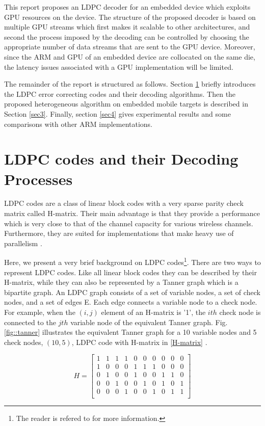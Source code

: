 \documentclass{article}
\begin{document}
This report proposes an LDPC decoder for an embedded device which exploits GPU resources on the device. The structure of the proposed decoder is based on multiple GPU streams which first makes it scalable to other architectures, and second the process imposed by the decoding can be controlled by choosing the appropriate number of data streams that are sent to the GPU device. Moreover, since the ARM and GPU of an embedded device are collocated on the same die, the latency issues associated with a GPU implementation will be limited.

The remainder of the report is structured as follows. Section \ref{sec2} briefly introduces the LDPC error correcting codes and their decoding algorithms. Then the proposed heterogeneous algorithm on embedded mobile targets is described in Section \ref{sec3}. Finally, section \ref{sec4} gives experimental results and some comparisons with other ARM implementations.

\section{LDPC codes and their Decoding Processes}\label{sec2}

LDPC codes are a class of linear block codes with a very sparse parity check matrix called H-matrix. Their main advantage is that they provide a performance which is very close to that of the channel capacity for various wireless channels. Furthermore, they are suited for implementations that make heavy use of parallelism \cite{art_castello}.

Here, we present a very brief background on LDPC codes\footnote{The reader is refered to \cite{art_castello} for more information.}. There are two ways to represent LDPC codes. Like all linear block codes they can be described by their H-matrix, while they can also be represented by a Tanner graph which is a bipartite graph. An LDPC graph consists of a set of variable nodes, a set of check nodes, and a set of edges E. Each edge connects a variable node to a check node. For example, when the $(i,j)$ element of an H-matrix is '1', the $ith$ check node is connected to the $jth$ variable node of the equivalent Tanner graph. Fig.\ref{fig::tanner} illustrates the equivalent Tanner graph for a 10 variable nodes and 5 check nodes, $(10,5)$, LDPC code with H-matrix in \eqref{H-matrix} \cite{art_castello}.

\begin{equation}\label{H-matrix}
H=
  \begin{bmatrix}
    1 & 1 & 1 & 1 & 0 &0 &0 &0 &0 &0 \\
    1 & 0 & 0 & 0 & 1 &1 &1 &0 &0 &0 \\
    0 & 1 & 0 & 0 & 1 &0 &0 &1 &1 &0 \\
    0 & 0 & 1 & 0 & 0 &1 &0 &1 &0 &1 \\
    0 & 0 & 0 & 1 & 0 &0 &1 &0 &1 &1 \\
  \end{bmatrix}
\end{equation}
\end{document}
